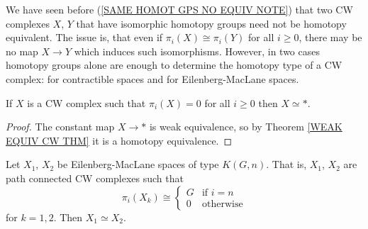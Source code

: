We have seen before (\ref{SAME HOMOT GPS NO EQUIV NOTE}) that two CW complexes $X$, $Y$
that have isomorphic homotopy groups need not be homotopy equivalent. The issue is, that 
even if $\pi_{i}(X) \cong \pi_{i}(Y)$ for all $i\geq 0$, there may be no map $X \to Y$
which induces such isomorphisms. However, in two cases homotopy groups alone are enough 
to determine the homotopy type of a CW complex: for contractible spaces and for Eilenberg-MacLane
spaces. 

\begin{proposition}
If $X$ is a CW complex such that $\pi_{i}(X) = 0$ for all $i\geq 0$ then $X\simeq \ast$. 
\end{proposition}

\begin{proof}
The constant map $X\to \ast$ is weak equivalence, so by Theorem \ref{WEAK EQUIV CW THM}
it is a homotopy equivalence.
\end{proof}


\begin{proposition}
\label{EM SPACES HOMOT UNIQUE PROP}
Let $X_{1}$, $X_{2}$ be Eilenberg-MacLane spaces of type $K(G, n)$. 
That is, $X_{1}$, $X_{2}$ are path connected CW complexes such that 
\[
\pi_{i}(X_{k}) \cong 
\begin{cases}
G & \text{if } i = n\\
0 & \text{otherwise}
\end{cases}
\]
for $k=1, 2$. Then $X_{1}\simeq X_{2}$. 
\end{proposition}

